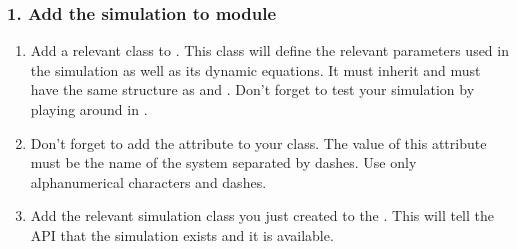 \documentclass[a4paper,landscape,10pt,english]{sphinxmanual}
\begin{document}
\subsubsection{1. Add the simulation to  module}
\label{\detokenize{code_docs/new_simulation:add-the-simulation-to-simulations-module}}\begin{enumerate}
%
\item {} 
Add a relevant class to {\hyperref[\detokenize{code_docs/simulation_api.simulation:module-simulation_api.simulation.simulations}]{}}.
This class will define the relevant parameters used in the simulation as well
as its dynamic equations. It must inherit
{\hyperref[\detokenize{code_docs/simulation_api.simulation:simulation_api.simulation.simulations.Simulation}]{}}
and must have the same structure as
{\hyperref[\detokenize{code_docs/simulation_api.simulation:simulation_api.simulation.simulations.HarmonicOsc1D}]{}} and
{\hyperref[\detokenize{code_docs/simulation_api.simulation:simulation_api.simulation.simulations.ChenLeeAttractor}]{}}. Don’t
forget to test your simulation by playing around in
{\hyperref[\detokenize{code_docs/simulation_api.simulation:module-simulation_api.simulation.demo_run_simulation}]{}}.

\item {} 
Don’t forget to add the attribute
{\hyperref[\detokenize{code_docs/simulation_api.simulation:simulation_api.simulation.simulations.Simulation.system}]{}} to your
class. The value of this attribute must be the name of the system separated
by dashes. Use only alphanumerical characters and dashes.

\item {} 
Add the relevant simulation class you just created to the 
{\hyperref[\detokenize{code_docs/simulation_api.simulation:simulation_api.simulation.simulations.Simulations}]{}}. This will tell
the API that the simulation exists and it is available.

\end{enumerate}
\end{document}
